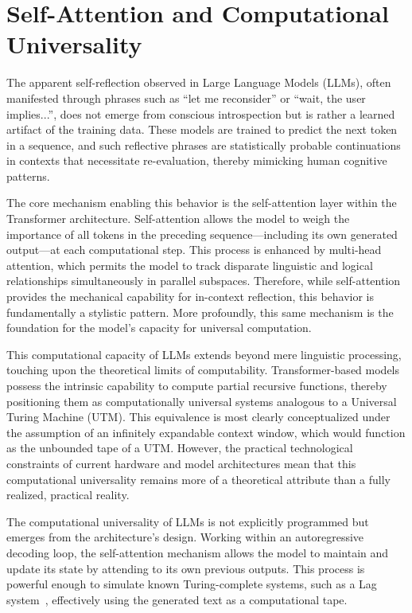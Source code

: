 \documentclass[%
  reprint,
  superscriptaddress,
  showpacs,
  showkeys,
  amsmath,amssymb,
  pra,
  longbibliography,
  floatfix,
  x11names
]{revtex4-2}
\begin{document}
\section{Self-Attention and Computational Universality}

The apparent self-reflection observed in Large Language Models (LLMs), often manifested through phrases such as ``let me reconsider'' or ``wait, the user implies...'', does not emerge from conscious introspection but is rather a learned artifact of the training data. These models are trained to predict the next token in a sequence, and such reflective phrases are statistically probable continuations in contexts that necessitate re-evaluation, thereby mimicking human cognitive patterns.

The core mechanism enabling this behavior is the self-attention layer within the Transformer architecture. Self-attention allows the model to weigh the importance of all tokens in the preceding sequence---including its own generated output---at each computational step. This process is enhanced by multi-head attention, which permits the model to track disparate linguistic and logical relationships simultaneously in parallel subspaces. Therefore, while self-attention provides the mechanical capability for in-context reflection, this behavior is fundamentally a stylistic pattern. More profoundly, this same mechanism is the foundation for the model's capacity for universal computation.

This computational capacity of LLMs extends beyond mere linguistic processing, touching upon the theoretical limits of computability. Transformer-based models possess the intrinsic capability to compute partial recursive functions, thereby positioning them as computationally universal systems analogous to a Universal Turing Machine (UTM). This equivalence is most clearly conceptualized under the assumption of an infinitely expandable context window, which would function as the unbounded tape of a UTM. However, the practical technological constraints of current hardware and model architectures mean that this computational universality remains more of a theoretical attribute than a fully realized, practical reality.

The computational universality of LLMs is not explicitly programmed but emerges from the architecture's design.
Working within an autoregressive decoding loop, the self-attention mechanism allows the model to maintain and update its state by attending to its own previous outputs. This process is powerful enough to simulate known Turing-complete systems, such as a Lag system~\cite{schuurmans2024autoregressivelargelanguagemodels}, effectively using the generated text as a computational tape.
\end{document}
